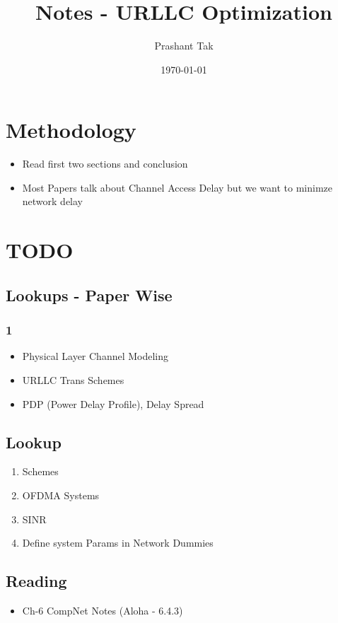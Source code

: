 \documentclass[11pt]{article}
\author{Prashant Tak}
\date{\today}
\title{Notes - URLLC Optimization}
\begin{document}
\maketitle
\setcounter{tocdepth}{2}
\tableofcontents \clearpage
\section{Methodology}
\label{sec:org036007b}
\begin{itemize}
\item Read first two sections and conclusion
\item Most Papers talk about Channel Access Delay but we want to minimze network delay
\end{itemize}
\section{TODO}
\label{sec:org1ec20c0}
\subsection{Lookups - Paper Wise}
\label{sec:orgf6bb34b}
\subsubsection{1}
\label{sec:org1a11f6f}
\begin{itemize}
\item Physical Layer Channel Modeling
\item URLLC Trans Schemes
\item PDP (Power Delay Profile), Delay Spread
\end{itemize}
\subsection{Lookup}
\label{sec:org20d26f6}
\begin{enumerate}
\item Schemes
\item OFDMA Systems
\item SINR
\item Define system Params in Network Dummies
\end{enumerate}
\subsection{Reading}
\label{sec:orgd24ecc7}
\begin{itemize}
\item Ch-6 CompNet Notes (Aloha - 6.4.3)
\end{itemize}
\end{document}

